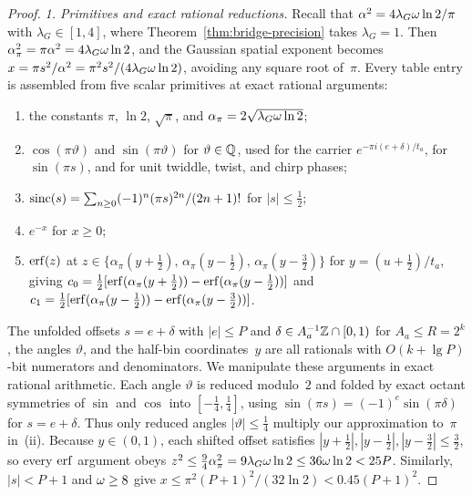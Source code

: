 \begin{proof}
\emph{1. Primitives and exact rational reductions.}
Recall that $\alpha^2=4\lambda_G\omega\ln 2/\pi$ with $\lambda_G\in[1,4]$, where Theorem~\ref{thm:bridge-precision} takes $\lambda_G=1$. Then $\alpha_\pi^2=\pi\alpha^2=4\lambda_G\omega\ln 2$, and the Gaussian spatial exponent becomes $x=\pi s^2/\alpha^2=\pi^2 s^2/(4\lambda_G\omega\ln 2)$, avoiding any square root of~$\pi$. Every table entry is assembled from five scalar primitives at exact rational arguments:
\begin{enumerate}[label=(\roman*),nosep,leftmargin=*]
  \item the constants $\pi$, $\ln 2$, $\sqrt\pi$, and $\alpha_\pi=2\sqrt{\lambda_G\omega\ln 2}$;

  \item $\cos(\pi\vartheta)$ and $\sin(\pi\vartheta)$ for $\vartheta\in\mathbb{Q}$, used for the carrier $e^{-\pi i(e+\delta)/t_a}$, for $\sin(\pi s)$, and for unit twiddle, twist, and chirp phases;

  \item $\operatorname{sinc}(s)=\sum_{n\ge 0}(-1)^n(\pi s)^{2n}/(2n+1)!$ for $|s|\le\tfrac12$;

  \item $e^{-x}$ for $x\ge 0$;

  \item $\operatorname{erf}(z)$ at $z\in\{\alpha_\pi(y+\tfrac12),\,\alpha_\pi(y-\tfrac12),\,\alpha_\pi(y-\tfrac32)\}$ for $y=(u+\tfrac12)/t_a$, giving $c_0=\tfrac12[\operatorname{erf}(\alpha_\pi(y+\tfrac12))-\operatorname{erf}(\alpha_\pi(y-\tfrac12))]$ and $c_1=\tfrac12[\operatorname{erf}(\alpha_\pi(y-\tfrac12))-\operatorname{erf}(\alpha_\pi(y-\tfrac32))]$.
\end{enumerate}

The unfolded offsets $s=e+\delta$ with $|e|\le P$ and $\delta\in A_a^{-1}\mathbb{Z}\cap[0,1)$ for $A_a\le R=2^k$, the angles $\vartheta$, and the half-bin coordinates~$y$ are all rationals with $O(k+\lg P)$-bit numerators and denominators. We manipulate these arguments in exact rational arithmetic. Each angle $\vartheta$ is reduced modulo~$2$ and folded by exact octant symmetries of $\sin$ and $\cos$ into $[-\tfrac14,\tfrac14]$, using $\sin(\pi s)=(-1)^e\sin(\pi\delta)$ for $s=e+\delta$. Thus only reduced angles $|\vartheta|\le\tfrac14$ multiply our approximation to~$\pi$ in~(ii). Because $y\in(0,1)$, each shifted offset satisfies $|y+\tfrac12|,|y-\tfrac12|,|y-\tfrac32|\le\tfrac32$, so every $\operatorname{erf}$ argument obeys $z^2\le\tfrac94\alpha_\pi^2=9\lambda_G\omega\ln 2\le 36\omega\ln 2<25P$. Similarly, $|s|<P+1$ and $\omega\ge 8$ give $x\le\pi^2(P+1)^2/(32\ln 2)<0.45(P+1)^2$.


\end{proof}
